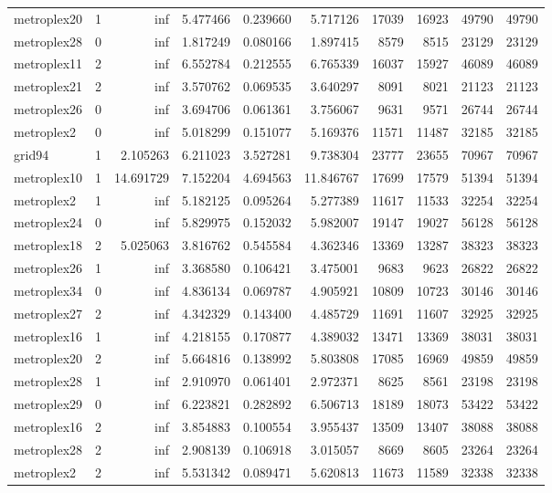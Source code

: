 \begin{longtable}{|l|r|r|r|r|r|r|r|r|r|}
metroplex20 & 1 & inf & 5.477466 & 0.239660 & 5.717126 & 17039 & 16923 & 49790 & 49790 \\
metroplex28 & 0 & inf & 1.817249 & 0.080166 & 1.897415 & 8579 & 8515 & 23129 & 23129 \\
metroplex11 & 2 & inf & 6.552784 & 0.212555 & 6.765339 & 16037 & 15927 & 46089 & 46089 \\
metroplex21 & 2 & inf & 3.570762 & 0.069535 & 3.640297 & 8091 & 8021 & 21123 & 21123 \\
metroplex26 & 0 & inf & 3.694706 & 0.061361 & 3.756067 & 9631 & 9571 & 26744 & 26744 \\
metroplex2 & 0 & inf & 5.018299 & 0.151077 & 5.169376 & 11571 & 11487 & 32185 & 32185 \\
grid94 & 1 & 2.105263 & 6.211023 & 3.527281 & 9.738304 & 23777 & 23655 & 70967 & 70967 \\
metroplex10 & 1 & 14.691729 & 7.152204 & 4.694563 & 11.846767 & 17699 & 17579 & 51394 & 51394 \\
metroplex2 & 1 & inf & 5.182125 & 0.095264 & 5.277389 & 11617 & 11533 & 32254 & 32254 \\
metroplex24 & 0 & inf & 5.829975 & 0.152032 & 5.982007 & 19147 & 19027 & 56128 & 56128 \\
metroplex18 & 2 & 5.025063 & 3.816762 & 0.545584 & 4.362346 & 13369 & 13287 & 38323 & 38323 \\
metroplex26 & 1 & inf & 3.368580 & 0.106421 & 3.475001 & 9683 & 9623 & 26822 & 26822 \\
metroplex34 & 0 & inf & 4.836134 & 0.069787 & 4.905921 & 10809 & 10723 & 30146 & 30146 \\
metroplex27 & 2 & inf & 4.342329 & 0.143400 & 4.485729 & 11691 & 11607 & 32925 & 32925 \\
metroplex16 & 1 & inf & 4.218155 & 0.170877 & 4.389032 & 13471 & 13369 & 38031 & 38031 \\
metroplex20 & 2 & inf & 5.664816 & 0.138992 & 5.803808 & 17085 & 16969 & 49859 & 49859 \\
metroplex28 & 1 & inf & 2.910970 & 0.061401 & 2.972371 & 8625 & 8561 & 23198 & 23198 \\
metroplex29 & 0 & inf & 6.223821 & 0.282892 & 6.506713 & 18189 & 18073 & 53422 & 53422 \\
metroplex16 & 2 & inf & 3.854883 & 0.100554 & 3.955437 & 13509 & 13407 & 38088 & 38088 \\
metroplex28 & 2 & inf & 2.908139 & 0.106918 & 3.015057 & 8669 & 8605 & 23264 & 23264 \\
metroplex2 & 2 & inf & 5.531342 & 0.089471 & 5.620813 & 11673 & 11589 & 32338 & 32338 \\

\end{longtable}
